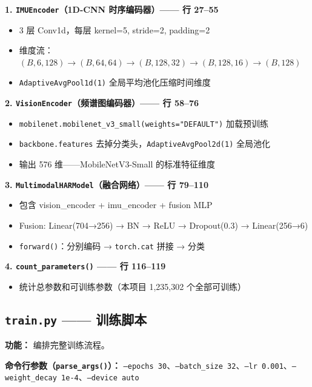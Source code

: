 \documentclass[12pt,a4paper]{ctexart}
\newcommand{\file}[1]{\texttt{#1}}
\newcommand{\code}[1]{\texttt{#1}}
\begin{document}
\textbf{1. \code{IMUEncoder}（1D-CNN 时序编码器）—— 行 27--55}
\begin{itemize}
    \item 3 层 Conv1d，每层 kernel=5, stride=2, padding=2
    \item 维度流：$(B,6,128) \rightarrow (B,64,64) \rightarrow (B,128,32) \rightarrow (B,128,16) \rightarrow (B,128)$
    \item \code{AdaptiveAvgPool1d(1)} 全局平均池化压缩时间维度
\end{itemize}

\textbf{2. \code{VisionEncoder}（频谱图编码器）—— 行 58--76}
\begin{itemize}
    \item \code{mobilenet.mobilenet\_v3\_small(weights="DEFAULT")} 加载预训练
    \item \code{backbone.features} 去掉分类头，\code{AdaptiveAvgPool2d(1)} 全局池化
    \item 输出 576 维——MobileNetV3-Small 的标准特征维度
\end{itemize}

\textbf{3. \code{MultimodalHARModel}（融合网络）—— 行 79--110}
\begin{itemize}
    \item 包含 vision\_encoder + imu\_encoder + fusion MLP
    \item Fusion: Linear(704→256) → BN → ReLU → Dropout(0.3) → Linear(256→6)
    \item \code{forward()}：分别编码 → \code{torch.cat} 拼接 → 分类
\end{itemize}

\textbf{4. \code{count\_parameters()} —— 行 116--119}
\begin{itemize}
    \item 统计总参数和可训练参数（本项目 1,235,302 个全部可训练）
\end{itemize}

\subsection{\file{train.py} —— 训练脚本}

\textbf{功能：} 编排完整训练流程。

\textbf{命令行参数（\code{parse\_args()}）：}
\code{--epochs 30}、\code{--batch\_size 32}、\code{--lr 0.001}、\code{--weight\_decay 1e-4}、\code{--device auto}
\end{document}
